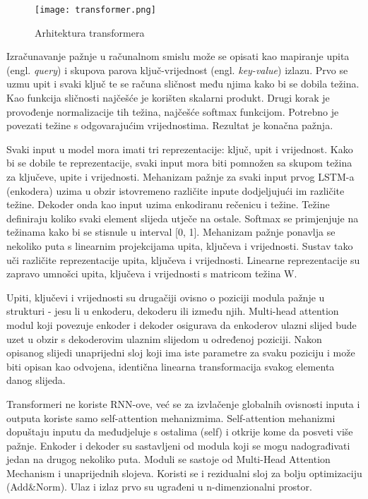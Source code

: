 \begin{figure}[!htb]
	\centering
	\texttt{[image: transformer.png]}
	\caption{Arhitektura transformera}
	\label{fig:transf}
\end{figure}

	Izračunavanje pažnje u računalnom smislu može se opisati kao mapiranje upita (engl. \textit{query}) i skupova parova ključ-vrijednost (engl. \textit{key-value}) izlazu. Prvo se uzmu upit i svaki ključ te se računa sličnost među njima kako bi se dobila težina. Kao funkcija sličnosti najčešće je korišten skalarni produkt. Drugi korak je provođenje normalizacije tih težina, najčešće softmax funkcijom. Potrebno je povezati težine s odgovarajućim vrijednostima. Rezultat je konačna pažnja. 

	Svaki input u model mora imati tri reprezentacije: ključ, upit i vrijednost. Kako bi se dobile te reprezentacije, svaki input mora biti pomnožen sa skupom težina za ključeve, upite i vrijednosti. Mehanizam pažnje za svaki input prvog LSTM-a (enkodera) uzima u obzir istovremeno različite inpute dodjeljujući im različite težine. Dekoder onda kao input uzima enkodiranu rečenicu i težine. Težine definiraju koliko svaki element slijeda utječe na ostale. Softmax se primjenjuje na težinama kako bi se stisnule u interval [0, 1]. 
Mehanizam pažnje ponavlja se nekoliko puta s linearnim projekcijama upita, ključeva i vrijednosti. Sustav tako uči različite reprezentacije upita, ključeva i vrijednosti. Linearne reprezentacije su zapravo umnošci upita, ključeva i vrijednosti s matricom težina W. 

	Upiti, ključevi i vrijednosti su drugačiji ovisno o poziciji modula pažnje u strukturi - jesu li u enkoderu, dekoderu ili između njih. Multi-head attention modul koji povezuje enkoder i dekoder osigurava da enkoderov ulazni slijed bude uzet u obzir s dekoderovim ulaznim slijedom u određenoj poziciji. Nakon opisanog slijedi unaprijedni sloj koji ima iste parametre za svaku poziciju i može biti opisan kao odvojena, identična linearna transformacija svakog elementa danog slijeda.

	Transformeri ne koriste RNN-ove, već se za izvlačenje globalnih ovisnosti inputa i outputa koriste samo self-attention mehanizmima. Self-attention mehanizmi dopuštaju inputu da međudjeluje s ostalima (self) i otkrije kome da posveti više pažnje.
Enkoder i dekoder su sastavljeni od modula koji se mogu nadograđivati jedan na drugog nekoliko puta. Moduli se sastoje od Multi-Head Attention Mechanism i unaprijednih slojeva. Koristi se i rezidualni sloj za bolju optimizaciju (Add\&Norm). Ulaz i izlaz prvo su ugrađeni u n-dimenzionalni prostor.

